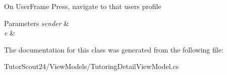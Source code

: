 On User\+Frame Press, navigate to that user\textquotesingle{}s profile 


\begin{DoxyParams}{Parameters}
{\em sender} & \\
\hline
{\em e} & \\
\hline
\end{DoxyParams}


The documentation for this class was generated from the following file\+:\begin{DoxyCompactItemize}
\item 
Tutor\+Scout24/\+View\+Models/Tutoring\+Detail\+View\+Model.\+cs\end{DoxyCompactItemize}
